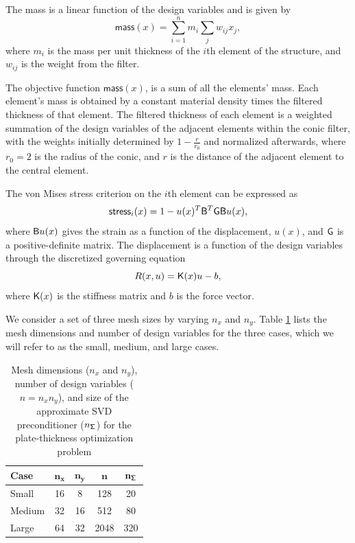 The mass is a linear function
of the design variables and is given by
\begin{equation*}
  \textsf{mass}(x) = \sum_{i=1}^{n} m_{i} \sum_{j} w_{ij} x_j,     %
\end{equation*}
where $m_i$ is the mass per unit thickness of the $i$th element of the
structure, and $w_{ij}$ is the weight from the filter. 

The objective function $\textsf{mass}(x)$, is a sum of all the elements' mass. 
Each element's mass is obtained by a constant material density times the filtered thickness of that element. 
The filtered thickness of each element is a weighted summation of the design variables 
of the adjacent elements within the conic filter, with the weights initially determined by 
$1-\frac{r}{r_0}$ and normalized afterwards,  where $r_0=2$ is the radius of the conic, and $r$ is the distance 
of the adjacent element to the central element.  


The von Mises stress
criterion on the $i$th element can be expressed as
\begin{equation*}
  \textsf{stress}_i(x) = 1 - u(x)^T \mathsf{B}^T \mathsf{G} \mathsf{B} u(x),
\end{equation*}
where $\mathsf{B} u(x)$ gives the strain as a function of the displacement,
$u(x)$, and $\mathsf{G}$ is a positive-definite matrix.  The displacement is a
function of the design variables through the discretized governing equation
\begin{equation*}
  R(x,u) = \mathsf{K}(x) u - b,
\end{equation*}
where $\mathsf{K}(x)$ is the stiffness matrix and $b$ is the force vector.

We consider a set of three mesh sizes by varying $n_x$ and $n_y$.  Table
\ref{tab:mesh_sizes} lists the mesh dimensions and number of design variables
for the three cases, which we will refer to as the small, medium, and large
cases.

\begin{table}[tbp]
  \begin{center}
    \caption{Mesh dimensions ($n_x$ and $n_y$), number of design variables ($n =
      n_x n_y$), and size of the approximate SVD preconditioner
      ($n_{\mathsf{\Sigma}}$) for the plate-thickness optimization
      problem \label{tab:mesh_sizes}}
  \begin{tabular}{ l c c c c}
    \textbf{Case} & $\mathbf{n_x}$  & $\mathbf{n_y}$ & $\mathbf{n}$
    & $\mathbf{{n_{\mathsf{\Sigma}}}}$
    \\ \hline
    \rule{0ex}{3ex}%
    Small  &   16 & 8  & 128  & 20 \\ 
    Medium &   32 & 16 & 512  & 80 \\  
    Large  &   64 & 32 & 2048 & 320  
  \end{tabular}
  \end{center}
\end{table}

